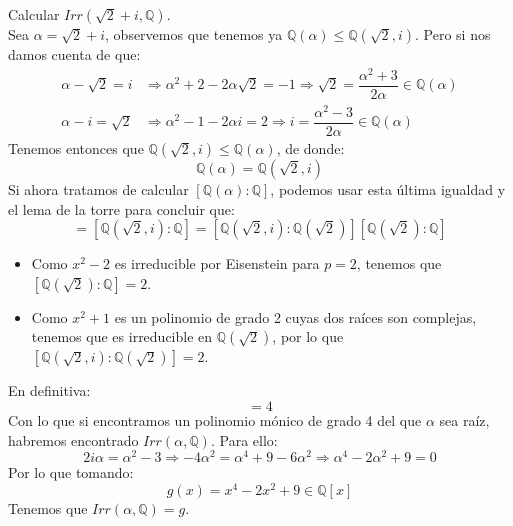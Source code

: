 \begin{ejercicio}
    Calcular $Irr(\sqrt{2}+i,\mathbb{Q})$.\\ 

    \noindent
    Sea $\alpha = \sqrt{2}+i$, observemos que tenemos ya $\mathbb{Q}(\alpha)\leq \mathbb{Q}(\sqrt{2},i)$. Pero si nos damos cuenta de que:
    \begin{align*}
        \alpha-\sqrt{2} = i &\Longrightarrow \alpha^2+2-2\alpha\sqrt{2} = -1 \Longrightarrow \sqrt{2} = \dfrac{\alpha^2+3}{2\alpha} \in \mathbb{Q}(\alpha) \\
        \alpha-i = \sqrt{2} &\Longrightarrow \alpha^2-1-2\alpha i = 2 \Longrightarrow i = \dfrac{\alpha^2-3}{2\alpha}\in \mathbb{Q}(\alpha)
    \end{align*}
    Tenemos entonces que $\mathbb{Q}(\sqrt{2},i)\leq \mathbb{Q}(\alpha)$, de donde:
    \begin{equation*}
        \mathbb{Q}(\alpha) = \mathbb{Q}(\sqrt{2},i)
    \end{equation*}
    Si ahora tratamos de calcular $[\mathbb{Q}(\alpha):\mathbb{Q}]$, podemos usar esta última igualdad y el lema de la torre para concluir que:
    \begin{equation*}
        [\mathbb{Q}(\alpha):\mathbb{Q}] = [\mathbb{Q}(\sqrt{2},i):\mathbb{Q}] = [\mathbb{Q}(\sqrt{2},i):\mathbb{Q}(\sqrt{2})][\mathbb{Q}(\sqrt{2}):\mathbb{Q}]
    \end{equation*}
    \begin{itemize}
        \item Como $x^2-2$ es irreducible por Eisenstein para $p=2$, tenemos que \newline $[\mathbb{Q}(\sqrt{2}):\mathbb{Q}]=2$.
        \item Como $x^2+1$ es un polinomio de grado 2 cuyas dos raíces son complejas, tenemos que es irreducible en $\mathbb{Q}(\sqrt{2})$, por lo que $[\mathbb{Q}(\sqrt{2},i):\mathbb{Q}(\sqrt{2})]=2$.
    \end{itemize}
    En definitiva:
    \begin{equation*}
        [\mathbb{Q}(\alpha):\mathbb{Q}] = 4
    \end{equation*}
    Con lo que si encontramos un polinomio mónico de grado 4 del que $\alpha$ sea raíz, habremos encontrado $Irr(\alpha,\mathbb{Q})$. Para ello:
    \begin{equation*}
        2i\alpha = \alpha^2 -3 \Longrightarrow -4\alpha^2 = \alpha^4 + 9 - 6\alpha^2 \Longrightarrow \alpha^4 -2\alpha^2+9 = 0
    \end{equation*}
    Por lo que tomando:
    \begin{equation*}
        g(x) = x^4-2x^2+9 \in \mathbb{Q}[x]
    \end{equation*}
    Tenemos que $Irr(\alpha,\mathbb{Q}) = g$.
\end{ejercicio}

